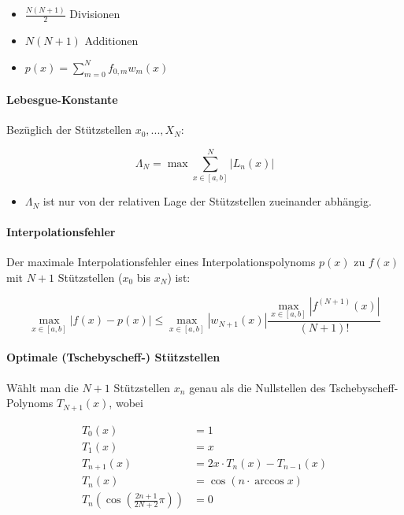 \documentclass[a4paper, 14pt]{article}
\begin{document}
	\begin{itemize}
		\item $\frac{N(N + 1)}{2}$ Divisionen
		\item $N(N + 1)$ Additionen
		\item $p(x) = \sum_{m = 0}^{N}{f_{0, m} w_m(x)}$
	\end{itemize}

	\paragraph{Lebesgue-Konstante}

	Bezüglich der Stützstellen $x_0, ..., X_N$:

	\begin{equation}
		\Lambda_N = \max{\sum_{x \in [a, b]}^{N}{|L_n(x)|}}
	\end{equation}

	\begin{itemize}
		\item $\Lambda_N$ ist nur von der relativen Lage der Stützstellen zueinander abhängig.
	\end{itemize}

	\paragraph{Interpolationsfehler}

	Der maximale Interpolationsfehler eines Interpolationspolynoms $p(x)$ zu $f(x)$ mit $N + 1$ Stützstellen ($x_0$ bis $x_N$) ist:

	\begin{equation}
		\max_{x \in [a, b]}{|f(x) - p(x)|} \leq \max_{x \in [a, b]}{|w_{N + 1}(x)|}\frac{\max_{x \in [a, b]}{|f^{(N + 1)}(x)|}}{(N + 1)!}
	\end{equation}

	\paragraph{Optimale (Tschebyscheff-) Stützstellen}
	
	Wählt man die $N + 1$ Stützstellen $x_n$ genau als die Nullstellen des Tschebyscheff-Polynoms $T_{N + 1}(x)$, wobei

	\begin{align}
		T_0(x)       & = 1 \\
		T_1(x)       & = x \\
		T_{n + 1}(x) & = 2x \cdot T_n(x) - T_{n - 1}(x) \\
		T_n(x)       & = \cos(n \cdot \arccos{x}) \\
		T_n(\cos{\left( \frac{2n + 1}{2N + 2} \pi \right)})       & = 0
	\end{align}
\end{document}
